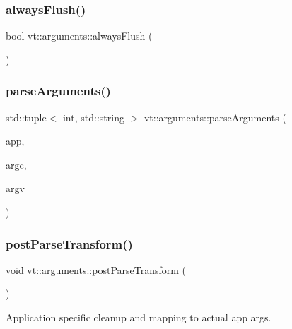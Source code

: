 \subsubsection{\texorpdfstring{always\+Flush()}{alwaysFlush()}}
{\footnotesize\ttfamily bool vt\+::arguments\+::always\+Flush (\begin{DoxyParamCaption}{ }\end{DoxyParamCaption})\hspace{0.3cm}{\ttfamily [inline]}}

\mbox{\label{namespacevt_1_1arguments_a39c463c5d2743546d1035d9654f9da77}} 
\subsubsection{\texorpdfstring{parse\+Arguments()}{parseArguments()}}
{\footnotesize\ttfamily std\+::tuple$<$ int, std\+::string $>$ vt\+::arguments\+::parse\+Arguments (\begin{DoxyParamCaption}\item[{C\+L\+I\+::\+App \&}]{app,  }\item[{int \&}]{argc,  }\item[{char $\ast$$\ast$\&}]{argv }\end{DoxyParamCaption})}

\mbox{\label{namespacevt_1_1arguments_ab06c8ee89e9ae3960b2f13a61c40f596}} 
\subsubsection{\texorpdfstring{post\+Parse\+Transform()}{postParseTransform()}}
{\footnotesize\ttfamily void vt\+::arguments\+::post\+Parse\+Transform (\begin{DoxyParamCaption}{ }\end{DoxyParamCaption})}

Application specific cleanup and mapping to actual app args. \mbox{\label{namespacevt_1_1arguments_ae1a1115524b75b6cc64e19968ff16c09}} 
